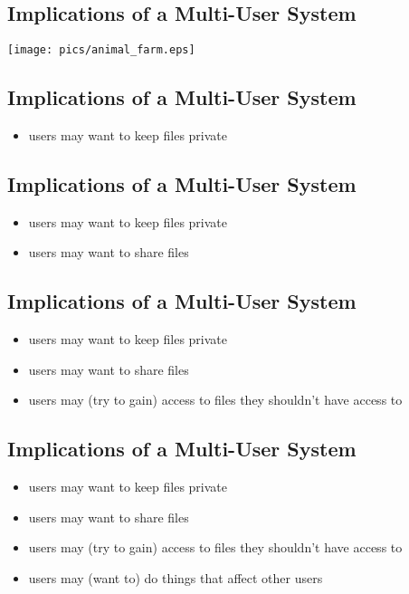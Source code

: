 \documentclass[xga]{xdvislides}
\begin{document}
\subsection{Implications of a Multi-User System}
\vspace*{\fill}
\begin{center}
	\texttt{[image: pics/animal\_farm.eps]}
\end{center}
\vspace*{\fill}

\subsection{Implications of a Multi-User System}
\begin{itemize}
	\item users may want to keep files private
\end{itemize}

\subsection{Implications of a Multi-User System}
\begin{itemize}
	\item users may want to keep files private
	\item users may want to share files
\end{itemize}

\subsection{Implications of a Multi-User System}
\begin{itemize}
	\item users may want to keep files private
	\item users may want to share files
	\item users may (try to gain) access to files they shouldn't have access to
\end{itemize}

\subsection{Implications of a Multi-User System}
\begin{itemize}
	\item users may want to keep files private
	\item users may want to share files
	\item users may (try to gain) access to files they shouldn't have access to
	\item users may (want to) do things that affect other users
\end{itemize}
\end{document}
